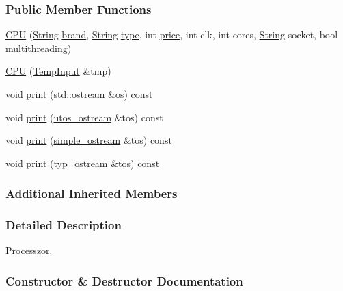 \subsubsection*{Public Member Functions}
\begin{DoxyCompactItemize}
\item 
\mbox{\hyperlink{class_c_p_u_a1aa85a6c976fe5b665dcb9fd6d8fdd1e}{C\+PU}} (\mbox{\hyperlink{class_string}{String}} \mbox{\hyperlink{class_part_ae06f2fdeb7fbbdb229a7aca151f3e341}{brand}}, \mbox{\hyperlink{class_string}{String}} \mbox{\hyperlink{class_part_a101dbcc5c4b21564df7414c7eb0eae88}{type}}, int \mbox{\hyperlink{class_part_a8e71223aed1da95a974f33d8d6c91bb1}{price}}, int clk, int cores, \mbox{\hyperlink{class_string}{String}} socket, bool multithreading)
\item 
\mbox{\hyperlink{class_c_p_u_a9147d84f815b9a242ba618877e6b2673}{C\+PU}} (\mbox{\hyperlink{struct_temp_input}{Temp\+Input}} \&tmp)
\item 
void \mbox{\hyperlink{class_c_p_u_ad4d3ebb288deeaad640e034bdb71a40a}{print}} (std\+::ostream \&os) const
\item 
void \mbox{\hyperlink{class_c_p_u_a0aea700bac0896b9e4434770737078d0}{print}} (\mbox{\hyperlink{structutos__ostream}{utos\+\_\+ostream}} \&tos) const
\item 
void \mbox{\hyperlink{class_c_p_u_a2f130a0263e32387554c128aedb6f9ed}{print}} (\mbox{\hyperlink{structsimple__ostream}{simple\+\_\+ostream}} \&tos) const
\item 
void \mbox{\hyperlink{class_c_p_u_aa2cf81d7f0005da72c7a99b1b9459c27}{print}} (\mbox{\hyperlink{structtyp__ostream}{typ\+\_\+ostream}} \&tos) const
\end{DoxyCompactItemize}
\subsubsection*{Additional Inherited Members}


\subsubsection{Detailed Description}
Processzor. 

\subsubsection{Constructor \& Destructor Documentation}
\mbox{\label{class_c_p_u_a1aa85a6c976fe5b665dcb9fd6d8fdd1e}} 
